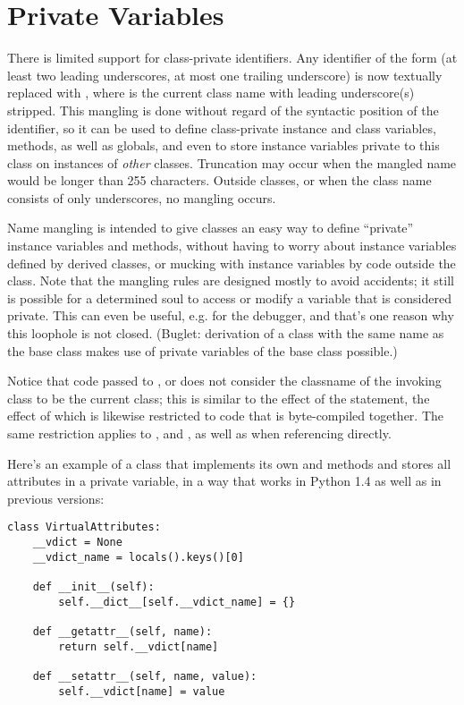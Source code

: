 \documentclass{manual}
\begin{document}
\section{Private Variables \label{private}}

There is limited support for class-private
identifiers.  Any identifier of the form  (at least two
leading underscores, at most one trailing underscore) is now textually
replaced with , where  is the
current class name with leading underscore(s) stripped.  This mangling
is done without regard of the syntactic position of the identifier, so
it can be used to define class-private instance and class variables,
methods, as well as globals, and even to store instance variables
private to this class on instances of \emph{other} classes.  Truncation
may occur when the mangled name would be longer than 255 characters.
Outside classes, or when the class name consists of only underscores,
no mangling occurs.

Name mangling is intended to give classes an easy way to define
``private'' instance variables and methods, without having to worry
about instance variables defined by derived classes, or mucking with
instance variables by code outside the class.  Note that the mangling
rules are designed mostly to avoid accidents; it still is possible for
a determined soul to access or modify a variable that is considered
private.  This can even be useful, e.g. for the debugger, and that's
one reason why this loophole is not closed.  (Buglet: derivation of a
class with the same name as the base class makes use of private
variables of the base class possible.)

Notice that code passed to ,  or
 does not consider the classname of the invoking 
class to be the current class; this is similar to the effect of the 
 statement, the effect of which is likewise restricted to 
code that is byte-compiled together.  The same restriction applies to
,  and , as well as
when referencing  directly.

Here's an example of a class that implements its own
 and  methods and stores all
attributes in a private variable, in a way that works in Python 1.4 as
well as in previous versions:

\begin{verbatim}
class VirtualAttributes:
    __vdict = None
    __vdict_name = locals().keys()[0]
     
    def __init__(self):
        self.__dict__[self.__vdict_name] = {}
    
    def __getattr__(self, name):
        return self.__vdict[name]
    
    def __setattr__(self, name, value):
        self.__vdict[name] = value
\end{verbatim}
\end{document}

